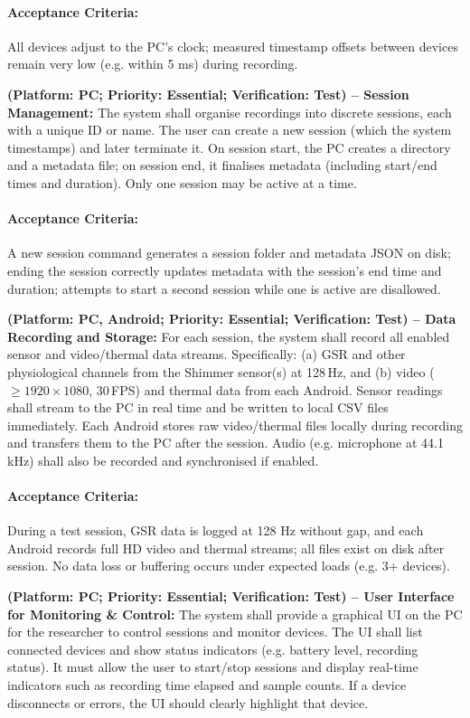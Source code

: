 \begin{description}[style=unboxed,leftmargin=0cm]
    \paragraph{Acceptance Criteria:} All devices adjust to the PC’s clock; measured timestamp offsets between devices remain very low (e.g. within 5 ms) during recording.

    \item[\textbf{FR4}] \textbf{(Platform: PC; Priority: Essential; Verification: Test) – Session Management:} The system shall organise recordings into discrete sessions, each with a unique ID or name. The user can create a new session (which the system timestamps) and later terminate it. On session start, the PC creates a directory and a metadata file; on session end, it finalises metadata (including start/end times and duration). Only one session may be active at a time.
    \paragraph{Acceptance Criteria:} A new session command generates a session folder and metadata JSON on disk; ending the session correctly updates metadata with the session’s end time and duration; attempts to start a second session while one is active are disallowed.

    \item[\textbf{FR5}] \textbf{(Platform: PC, Android; Priority: Essential; Verification: Test) – Data Recording and Storage:} For each session, the system shall record all enabled sensor and video/thermal data streams. Specifically: (a) GSR and other physiological channels from the Shimmer sensor(s) at 128\,Hz, and (b) video ($\geq 1920 \times 1080$, 30\,FPS) and thermal data from each Android. Sensor readings shall stream to the PC in real time and be written to local CSV files immediately. Each Android stores raw video/thermal files locally during recording and transfers them to the PC after the session. Audio (e.g. microphone at 44.1\,kHz) shall also be recorded and synchronised if enabled.
    \paragraph{Acceptance Criteria:} During a test session, GSR data is logged at 128 Hz without gap, and each Android records full HD video and thermal streams; all files exist on disk after session. No data loss or buffering occurs under expected loads (e.g. 3+ devices).

    \item[\textbf{FR6}] \textbf{(Platform: PC; Priority: Essential; Verification: Test) – User Interface for Monitoring \& Control:} The system shall provide a graphical UI on the PC for the researcher to control sessions and monitor devices. The UI shall list connected devices and show status indicators (e.g. battery level, recording status). It must allow the user to start/stop sessions and display real-time indicators such as recording time elapsed and sample counts. If a device disconnects or errors, the UI should clearly highlight that device.

\end{description}

